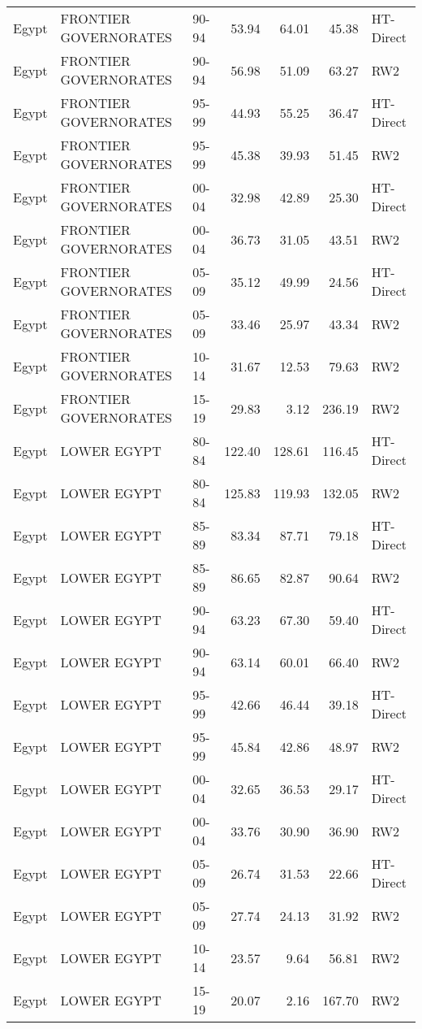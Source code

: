 \begin{longtable}{lllrrrl}
  Egypt & FRONTIER GOVERNORATES & 90-94 & 53.94 & 64.01 & 45.38 & HT-Direct \\ 
  Egypt & FRONTIER GOVERNORATES & 90-94 & 56.98 & 51.09 & 63.27 & RW2 \\ 
  Egypt & FRONTIER GOVERNORATES & 95-99 & 44.93 & 55.25 & 36.47 & HT-Direct \\ 
  Egypt & FRONTIER GOVERNORATES & 95-99 & 45.38 & 39.93 & 51.45 & RW2 \\ 
  Egypt & FRONTIER GOVERNORATES & 00-04 & 32.98 & 42.89 & 25.30 & HT-Direct \\ 
  Egypt & FRONTIER GOVERNORATES & 00-04 & 36.73 & 31.05 & 43.51 & RW2 \\ 
  Egypt & FRONTIER GOVERNORATES & 05-09 & 35.12 & 49.99 & 24.56 & HT-Direct \\ 
  Egypt & FRONTIER GOVERNORATES & 05-09 & 33.46 & 25.97 & 43.34 & RW2 \\ 
  Egypt & FRONTIER GOVERNORATES & 10-14 & 31.67 & 12.53 & 79.63 & RW2 \\ 
  Egypt & FRONTIER GOVERNORATES & 15-19 & 29.83 & 3.12 & 236.19 & RW2 \\ 
  Egypt & LOWER EGYPT & 80-84 & 122.40 & 128.61 & 116.45 & HT-Direct \\ 
  Egypt & LOWER EGYPT & 80-84 & 125.83 & 119.93 & 132.05 & RW2 \\ 
  Egypt & LOWER EGYPT & 85-89 & 83.34 & 87.71 & 79.18 & HT-Direct \\ 
  Egypt & LOWER EGYPT & 85-89 & 86.65 & 82.87 & 90.64 & RW2 \\ 
  Egypt & LOWER EGYPT & 90-94 & 63.23 & 67.30 & 59.40 & HT-Direct \\ 
  Egypt & LOWER EGYPT & 90-94 & 63.14 & 60.01 & 66.40 & RW2 \\ 
  Egypt & LOWER EGYPT & 95-99 & 42.66 & 46.44 & 39.18 & HT-Direct \\ 
  Egypt & LOWER EGYPT & 95-99 & 45.84 & 42.86 & 48.97 & RW2 \\ 
  Egypt & LOWER EGYPT & 00-04 & 32.65 & 36.53 & 29.17 & HT-Direct \\ 
  Egypt & LOWER EGYPT & 00-04 & 33.76 & 30.90 & 36.90 & RW2 \\ 
  Egypt & LOWER EGYPT & 05-09 & 26.74 & 31.53 & 22.66 & HT-Direct \\ 
  Egypt & LOWER EGYPT & 05-09 & 27.74 & 24.13 & 31.92 & RW2 \\ 
  Egypt & LOWER EGYPT & 10-14 & 23.57 & 9.64 & 56.81 & RW2 \\ 
  Egypt & LOWER EGYPT & 15-19 & 20.07 & 2.16 & 167.70 & RW2 \\ 

\end{longtable}
